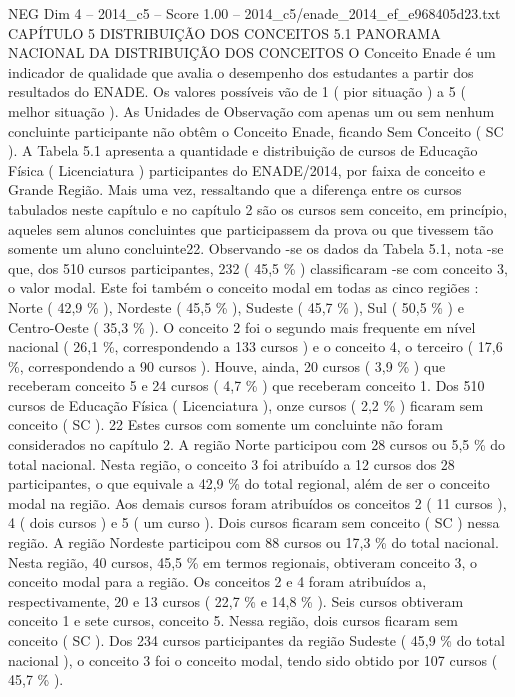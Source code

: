 \begin{textsample}{NEG Dim 4 – 2014\_c5 – Score 1.00 – 2014\_c5/enade\_2014\_ef\_e968405d23.txt}  \label{ex:f4_neg_206}
CAPÍTULO 5 DISTRIBUIÇÃO DOS CONCEITOS 5.1 PANORAMA NACIONAL DA DISTRIBUIÇÃO DOS CONCEITOS O Conceito Enade é um indicador de qualidade que avalia o desempenho dos estudantes a partir dos resultados do ENADE.
Os valores possíveis vão de 1 ( pior situação ) a 5 ( melhor situação ).
As Unidades de Observação com apenas um ou sem nenhum concluinte participante não obtêm o Conceito Enade, ficando Sem Conceito ( SC ).
A Tabela 5.1 apresenta a quantidade e distribuição de cursos de Educação Física ( Licenciatura ) participantes do ENADE/2014, por faixa de conceito e Grande Região.
Mais uma vez, ressaltando que a diferença entre os cursos tabulados neste capítulo e no capítulo 2 são os cursos sem conceito, em princípio, aqueles sem alunos concluintes que participassem da prova ou que tivessem tão somente um aluno concluinte22.
Observando -se os dados da Tabela 5.1, nota -se que, dos 510 cursos participantes, 232 ( 45,5 \% ) classificaram -se com conceito 3, o valor modal.
Este foi também o conceito modal em todas as cinco regiões : Norte ( 42,9 \% ), Nordeste ( 45,5 \% ), Sudeste ( 45,7 \% ), Sul ( 50,5 \% ) e Centro-Oeste ( 35,3 \% ).
O conceito 2 foi o segundo mais frequente em nível nacional ( 26,1 \%, correspondendo a 133 cursos ) e o conceito 4, o terceiro ( 17,6 \%, correspondendo a 90 cursos ).
Houve, ainda, 20 cursos ( 3,9 \% ) que receberam conceito 5 e 24 cursos ( 4,7 \% ) que receberam conceito 1.
Dos 510 cursos de Educação Física ( Licenciatura ), onze cursos ( 2,2 \% ) ficaram sem conceito ( SC ). 22 Estes cursos com somente um concluinte não foram considerados no capítulo 2.
A região Norte participou com 28 cursos ou 5,5 \% do total nacional.
Nesta região, o conceito 3 foi atribuído a 12 cursos dos 28 participantes, o que equivale a 42,9 \% do total regional, além de ser o conceito modal na região.
Aos demais cursos foram atribuídos os conceitos 2 ( 11 cursos ), 4 ( dois cursos ) e 5 ( um curso ).
Dois cursos ficaram sem conceito ( SC ) nessa região.
A região Nordeste participou com 88 cursos ou 17,3 \% do total nacional.
Nesta região, 40 cursos, 45,5 \% em termos regionais, obtiveram conceito 3, o conceito modal para a região.
Os conceitos 2 e 4 foram atribuídos a, respectivamente, 20 e 13 cursos ( 22,7 \% e 14,8 \% ).
Seis cursos obtiveram conceito 1 e sete cursos, conceito 5.
Nessa região, dois cursos ficaram sem conceito ( SC ).
Dos 234 cursos participantes da região Sudeste ( 45,9 \% do total nacional ), o conceito 3 foi o conceito modal, tendo sido obtido por 107 cursos ( 45,7 \% ).

\end{textsample}
